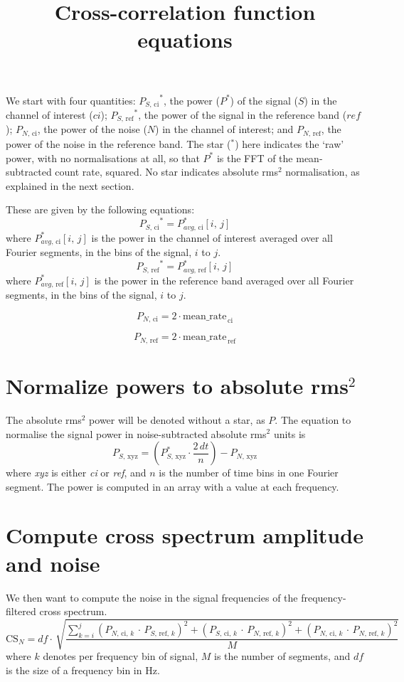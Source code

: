 \documentclass[11pt, oneside, reqno, a4paper]{article}
\title{Cross-correlation function equations}
\date{}
\newcommand{\be}{\begin{equation}}
\newcommand{\ee}{\end{equation}}
\newcommand{\scp}{\ensuremath{P_{S, \,\text{ci}}}}
\newcommand{\srp}{\ensuremath{P_{S, \,\text{ref}}}}
\newcommand{\ncp}{\ensuremath{P_{N, \,\text{ci}}}}
\newcommand{\nrp}{\ensuremath{P_{N, \,\text{ref}}}}
\theoremstyle{plain}
\numberwithin{equation}{section}
\begin{document}
\maketitle
We start with four quantities: 
$\scp^*$, the power ($P^*$) of the signal ($S$) in the channel of interest ($ci$); 
$\srp^*$, the power of the signal in the reference band ($ref$);
$\ncp$, the power of the noise ($N$) in the channel of interest; and
$\nrp$, the power of the noise in the reference band.
The star ($^*$) here indicates the `raw' power, with no normalisations at all, so that $P^*$ is the FFT of the mean-subtracted count rate, squared. No star indicates absolute rms$^2$ normalisation, as explained in the next section.

These are given by the following equations:
\be
\scp^* = P^*_{avg,\,\text{ci}} [i,\,j]
\ee
where $P^*_{avg,\,\text{ci}} [i,\,j]$ is the power in the channel of interest averaged over all Fourier segments, in the bins of the signal, $i$ to $j$.
\be
\srp^* = P^*_{avg,\,\text{ref}} [i,\,j]
\ee
where $P^*_{avg,\,\text{ref}} [i,\,j]$ is the power in the reference band averaged over all Fourier segments, in the bins of the signal, $i$ to $j$.

\be
\ncp = 2 \cdot \text{mean\_rate}_{\,\text{ci}}
\ee

\be
\nrp = 2 \cdot \text{mean\_rate}_{\,\text{ref}}
\ee

\section{Normalize powers to absolute rms$^2$}
The absolute rms$^2$ power will be denoted without a star, as $P$. The equation to normalise the signal power in noise-subtracted absolute rms$^2$ units is
\be
P_{S,\,\text{xyz}} = \left(P^*_{S,\,\text{xyz}} \cdot \frac{2\,dt}{n} \right) - P_{N, \,\text{xyz}}
\ee
where \textit{xyz} is either \textit{ci} or \textit{ref}, and $n$ is the number of time bins in one Fourier segment. The power is computed in an array with a value at each frequency.

\section{Compute cross spectrum amplitude and noise}
We then want to compute the noise in the signal frequencies of the frequency-filtered cross spectrum. 
\be
\text{CS}_{N} = df \cdot\,\sqrt{\frac{\sum_{k=i}^j \left(P_{N, \,\text{ci}, \,k} \,\cdot\, P_{S, \,\text{ref},\,k} \right)^2 + \left(P_{S, \,\text{ci}, \,k} \,\cdot\, P_{N, \,\text{ref},\,k} \right)^2 + \left(P_{N, \,\text{ci}, \,k} \,\cdot\, P_{N, \,\text{ref},\,k} \right)^2 }{M}}
\ee
where $k$ denotes per frequency bin of signal, $M$ is the number of segments, and $df$ is the size of a frequency bin in Hz.
\end{document}

